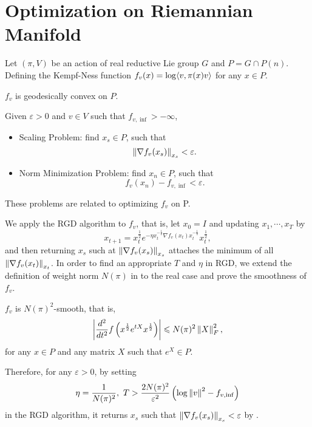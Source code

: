 \documentclass[papersize]{suribtabst}
\begin{document}
	\section{Optimization on Riemannian Manifold}

	Let $(\pi,V)$ be an action of real reductive Lie group $G$ and $P = G \cap P(n)$. Defining the Kempf-Ness function $f_v(x) = \log \langle v,\pi(x)v \rangle$ for any $x \in P$. 
	\begin{thm}
		$f_v$ is geodesically convex on $P$.
	\end{thm}
	Given $\varepsilon > 0$ and $v \in V$ such that $f_{v,\inf} > -\infty$, 
	\begin{itemize}
		\item {Scaling Problem:} find $x_s \in P$, such that
		\begin{equation*}
			\left\lVert\nabla f_v(x_s)\right\lVert_{x_s} < \varepsilon.
		\end{equation*}
		\item {Norm Minimization Problem:} find $x_n \in P$, such that
		\begin{equation*}
			f_v(x_n) - f_{v,\inf} < \varepsilon.
		\end{equation*}
	\end{itemize}
	These problems are related to optimizing $f_v$ on P.

	We apply the RGD algorithm to $f_v$, that is, let $x_0 = I$ and updating $x_1,\cdots,x_T$ by
	\begin{equation*}
		x_{t+1} = x_t^{\frac{1}{2}}e^{-\eta x_t^{-\frac{1}{2}}\nabla f_v(x_t) x_t^{-\frac{1}{2}}}x_t^{\frac{1}{2}},
	\end{equation*}
	and then returning $x_s$ such at $\left\lVert\nabla f_v(x_s)\right\lVert_{x_s}$ attaches the minimum of all $\left\lVert\nabla f_v(x_t)\right\lVert_{x_t}$. In order to find an appropriate $T$ and $\eta$ in RGD, we extend the definition of weight norm $N(\pi)$ in \cite{key8} to the real case and prove the smoothness of $f_v$.
	\begin{thm}
		$f_v$ is $N(\pi)^2$-smooth, that is,
      \begin{equation*}
        \left\lvert\frac{d^2}{dt^2}f\left(x^{\frac{1}{2}}e^{tX}x^{\frac{1}{2}}\right)\right\lvert \leqslant N(\pi)^2\left\lVert X\right\lVert_{F}^2,
      \end{equation*}
      for any $x\in P$ and any matrix $X$ such that $e^X \in P$.
	\end{thm}
	Therefore, for any $\varepsilon > 0$, by setting 
	\begin{equation*}
		\eta=\frac{1}{N(\pi)^2},~T > \frac{2N(\pi)^2}{\varepsilon^2}\left(\log \left\lVert v\right\lVert^2-f_{v,\inf}\right)
	\end{equation*}
	in the RGD algorithm, it returns $x_s$ such that $\left\lVert\nabla f_v(x_s)\right\lVert_{x_s} < \varepsilon$ by \cite{key7}.
\end{document}
